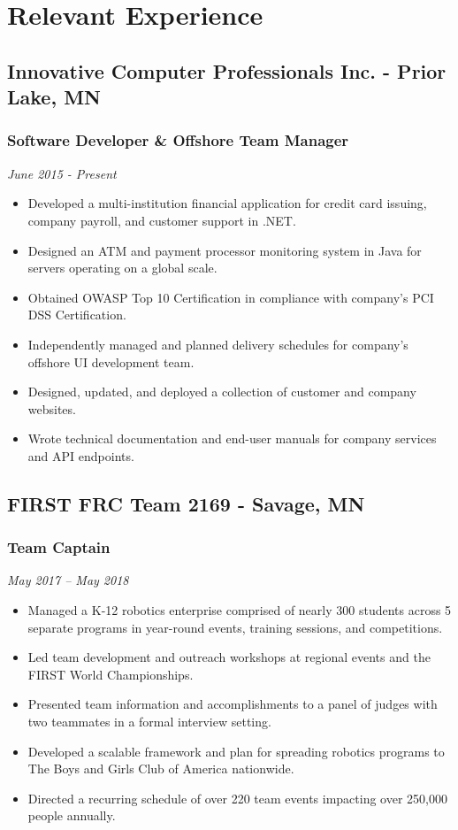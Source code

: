 \documentclass{article}
\begin{document}
\section{Relevant Experience}
\subsection{Innovative Computer Professionals Inc. - Prior Lake, MN}
\subsubsection{Software Developer \& Offshore Team Manager}
\textit{June 2015 - Present}
\begin{itemize}[leftmargin=*]
\item Developed a multi-institution financial application for credit card issuing, company payroll, and customer support in .NET.
\item Designed an ATM and payment processor monitoring system in Java for servers operating on a global scale.
\item Obtained OWASP Top 10 Certification in compliance with company’s PCI DSS Certification.
\item Independently managed and planned delivery schedules for company’s offshore UI development team.
\item Designed, updated, and deployed a collection of customer and company websites.
\item Wrote technical documentation and end-user manuals for company services and API endpoints.
\end{itemize}
\subsection{FIRST FRC Team 2169 - Savage, MN}
\subsubsection{Team Captain}
\textit{May 2017 – May 2018}
\begin{itemize}[leftmargin=*]
\item Managed a K-12 robotics enterprise comprised of nearly 300 students across 5 separate programs in year-round events, training sessions, and competitions.
\item Led team development and outreach workshops at regional events and the FIRST World Championships.
\item Presented team information and accomplishments to a panel of judges with two teammates in a formal interview setting.
\item Developed a scalable framework and plan for spreading robotics programs to The Boys and Girls Club of America nationwide.
\item Directed a recurring schedule of over 220 team events impacting over 250,000 people annually.    
\end{itemize}
\end{document}
